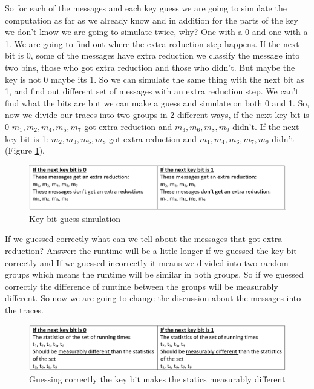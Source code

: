 So for each of the messages and each key guess we are going to simulate the computation as far as we already know and in addition for the parts of the key we don’t know we are going to simulate twice, why? One with a 0 and one with a 1. We are going to find out where the extra reduction step happens. If the next bit is 0, some of the messages have extra reduction we classify the message into two bins, those who got extra reduction and those who didn’t. But maybe the key is not 0 maybe its 1. So we can simulate the same thing with the next bit as 1, and find out different set of messages with an extra reduction step. We can’t find what the bits are but we can make a guess and simulate on both 0 and 1. So, now we divide our traces into two groups in 2 different ways, if the next key bit is 0 \(m_1,m_2,m_4,m_5,m_7\) got extra reduction and \(m_3,m_6,m_8,m_9\) didn’t. If the next key bit is 1: \(m_2,m_3,m_5,m_8\) got extra reduction and \(m_1,m_4,m_6,m_7,m_9\) didn’t (Figure \ref{extraRed:fig}). 


\begin{figure}[H]
    \centering
    \includegraphics[scale=0.3]{images/extraRed.PNG}
    \caption{Key bit guess simulation} \label{extraRed:fig}
\end{figure}

If we guessed correctly what can we tell about the messages that got extra reduction? Answer: the runtime will be a little longer if we guessed the key bit correctly and If we guessed incorrectly it means we divided into two random groups which means the runtime will be similar in both groups. So if we guessed correctly the difference of runtime between the groups will be measurably different. So now we are going to change the discussion about the messages into the traces.

\begin{figure}[H]
    \centering
    \includegraphics[scale=0.3]{images/extraStat.PNG}
    \caption{Guessing correctly the key bit makes the statics measurably different} \label{extraStat:fig}
\end{figure}



